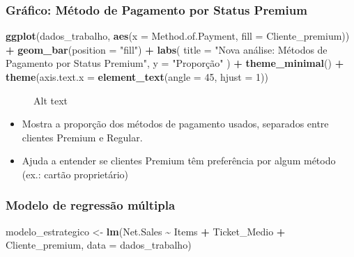 \documentclass[
]{article}
\makeatletter
\newenvironment{Shaded}{\begin{snugshade}}{\end{snugshade}}
\newcommand{\AttributeTok}[1]{\textcolor[rgb]{0.13,0.29,0.53}{#1}}
\newcommand{\DecValTok}[1]{\textcolor[rgb]{0.00,0.00,0.81}{#1}}
\newcommand{\FunctionTok}[1]{\textcolor[rgb]{0.13,0.29,0.53}{\textbf{#1}}}
\newcommand{\NormalTok}[1]{#1}
\newcommand{\OtherTok}[1]{\textcolor[rgb]{0.56,0.35,0.01}{#1}}
\newcommand{\SpecialCharTok}[1]{\textcolor[rgb]{0.81,0.36,0.00}{\textbf{#1}}}
\newcommand{\StringTok}[1]{\textcolor[rgb]{0.31,0.60,0.02}{#1}}
\newcommand*\pandocbounded[1]{%
  \sbox\pandoc@box{#1}%
  \Gscale@div\@tempa{\textheight}{\dimexpr\ht\pandoc@box+\dp\pandoc@box\relax}%
  \Gscale@div\@tempb{\linewidth}{\wd\pandoc@box}%
  \ifdim\@tempb\p@<\@tempa\p@\let\@tempa\@tempb\fi%
  \ifdim\@tempa\p@<\p@\scalebox{\@tempa}{\usebox\pandoc@box}%
  \else\usebox{\pandoc@box}%
  \fi%
}
\makeatother
\begin{document}
\subsubsection{Gráfico: Método de Pagamento por Status
Premium}\label{gruxe1fico-muxe9todo-de-pagamento-por-status-premium}

\begin{Shaded}
\begin{Highlighting}[]
  \FunctionTok{ggplot}\NormalTok{(dados\_trabalho, }\FunctionTok{aes}\NormalTok{(}\AttributeTok{x =}\NormalTok{ Method.of.Payment, }\AttributeTok{fill =}\NormalTok{ Cliente\_premium)) }\SpecialCharTok{+}
    \FunctionTok{geom\_bar}\NormalTok{(}\AttributeTok{position =} \StringTok{"fill"}\NormalTok{) }\SpecialCharTok{+}
    \FunctionTok{labs}\NormalTok{(}
      \AttributeTok{title =} \StringTok{"Nova análise: Métodos de Pagamento por Status Premium"}\NormalTok{,}
      \AttributeTok{y =} \StringTok{"Proporção"}
\NormalTok{    ) }\SpecialCharTok{+}
    \FunctionTok{theme\_minimal}\NormalTok{() }\SpecialCharTok{+}
    \FunctionTok{theme}\NormalTok{(}\AttributeTok{axis.text.x =} \FunctionTok{element\_text}\NormalTok{(}\AttributeTok{angle =} \DecValTok{45}\NormalTok{, }\AttributeTok{hjust =} \DecValTok{1}\NormalTok{))}
\end{Highlighting}
\end{Shaded}

\begin{figure}
\centering
\pandocbounded{\texttt{[image: 16.png]}}
\caption{Alt text}
\end{figure}

\begin{itemize}
\item
  Mostra a proporção dos métodos de pagamento usados, separados entre
  clientes Premium e Regular.
\item
  Ajuda a entender se clientes Premium têm preferência por algum método
  (ex.: cartão proprietário)
\end{itemize}

\subsubsection{Modelo de regressão
múltipla}\label{modelo-de-regressuxe3o-muxfaltipla}

\begin{Shaded}
\begin{Highlighting}[]
\NormalTok{modelo\_estrategico }\OtherTok{\textless{}{-}} \FunctionTok{lm}\NormalTok{(Net.Sales }\SpecialCharTok{\textasciitilde{}}\NormalTok{ Items }\SpecialCharTok{+}\NormalTok{ Ticket\_Medio }\SpecialCharTok{+}\NormalTok{ Cliente\_premium, }\AttributeTok{data =}\NormalTok{ dados\_trabalho)}
\end{Highlighting}
\end{Shaded}
\end{document}
